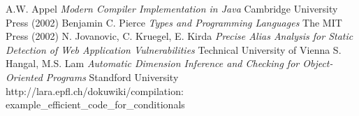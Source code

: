 \documentclass[a4paper]{article}
\begin{document}
\begin{thebibliography}{99}
  A.W. Appel {\it Modern Compiler Implementation in Java}
    Cambridge University Press (2002)
  Benjamin C. Pierce {\it Types and Programming Languages}
    The MIT Press (2002)
  N. Jovanovic, C. Kruegel, E. Kirda {\it Precise Alias Analysis for Static Detection of Web Application Vulnerabilities}
    Technical University of Vienna
  S. Hangal, M.S. Lam {\it Automatic Dimension Inference and Checking for Object-Oriented Programs}
    Standford University
  \mbox{http://lara.epfl.ch/dokuwiki/compilation:} \mbox{example\_efficient\_code\_for\_conditionals}
\end{thebibliography}
\end{document}

